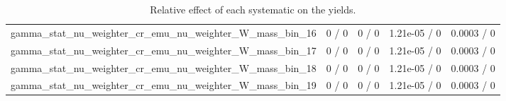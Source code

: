 \documentclass[10pt]{article}
\begin{document}
\begin{table}[htbp]
\begin{center}
\begin{tabular}{|c|c|c|c|c|}
  gamma_stat_nu_weighter_cr_emu_nu_weighter_W_mass_bin_16 & 0 / 0 & 0 / 0 & 1.21e-05 / 0 & 0.0003 / 0 \\ 
  gamma_stat_nu_weighter_cr_emu_nu_weighter_W_mass_bin_17 & 0 / 0 & 0 / 0 & 1.21e-05 / 0 & 0.0003 / 0 \\ 
  gamma_stat_nu_weighter_cr_emu_nu_weighter_W_mass_bin_18 & 0 / 0 & 0 / 0 & 1.21e-05 / 0 & 0.0003 / 0 \\ 
  gamma_stat_nu_weighter_cr_emu_nu_weighter_W_mass_bin_19 & 0 / 0 & 0 / 0 & 1.21e-05 / 0 & 0.0003 / 0 \\ 
\hline 
\end{tabular} 
\caption{Relative effect of each systematic on the yields.} 
\end{center} 
\end{table} 
\end{document}
